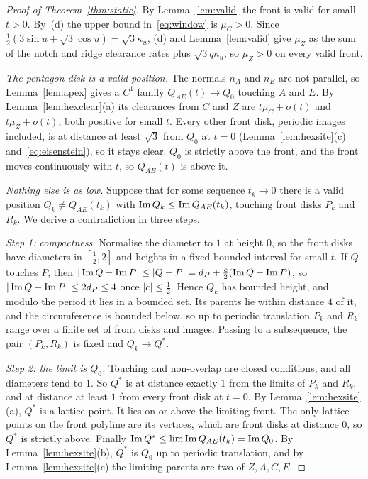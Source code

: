 \begin{proof}[Proof of Theorem~\ref{thm:static}]
By Lemma~\ref{lem:valid} the front is valid for small $t>0$. By~(d) the upper bound in~\eqref{eq:window} is
$\mu_C>0$. Since $\tfrac12(3\sin u+\sqrt3\cos u)=\sqrt3\kappa_u$, (d) and Lemma~\ref{lem:valid} give $\mu_Z$ as the sum
of the notch and ridge clearance rates plus $\sqrt3q\kappa_u$, so $\mu_Z>0$ on every valid front.

\emph{The pentagon disk is a valid position.} The normals $n_A$ and $n_E$ are not parallel, so
Lemma~\ref{lem:apex} gives a $C^1$ family $Q_{AE}(t)\to Q_0$ touching $A$ and $E$. By
Lemma~\ref{lem:hexclear}(a) its clearances from $C$ and $Z$ are $t\mu_C+o(t)$ and $t\mu_Z+o(t)$, both
positive for small $t$. Every other front disk, periodic images included, is at distance at least
$\sqrt3$ from $Q_0$ at $t=0$ (Lemma~\ref{lem:hexsite}(c) and~\eqref{eq:eisenstein}), so it stays clear.
$Q_0$ is strictly above the front, and the front moves continuously with $t$, so $Q_{AE}(t)$ is above it.

\emph{Nothing else is as low.} Suppose that for some sequence $t_k\to0$ there is a valid position
$Q_k\ne Q_{AE}(t_k)$ with $\operatorname{Im} Q_k\le\operatorname{Im} Q_{AE}(t_k)$, touching front disks $P_k$ and $R_k$. We derive a
contradiction in three steps.

\smallskip\noindent\emph{Step 1: compactness.} Normalise the diameter to $1$ at height $0$, so the front
disks have diameters in $[\tfrac12,2]$ and heights in a fixed bounded interval for small $t$. If $Q$ touches
$P$, then $|\operatorname{Im} Q-\operatorname{Im} P|\le|Q-P|=d_P+\tfrac c2(\operatorname{Im} Q-\operatorname{Im} P)$, so $|\operatorname{Im} Q-\operatorname{Im} P|\le2d_P\le4$ once $|c|\le\tfrac12$.
Hence $Q_k$ has bounded height, and modulo the period it lies in a bounded set. Its parents lie within
distance $4$ of it, and the circumference is bounded below, so up to periodic translation $P_k$ and
$R_k$ range over a finite set of front disks and images. Passing to a subsequence, the pair
$(P_k,R_k)$ is fixed and $Q_k\to Q^*$.

\smallskip\noindent\emph{Step 2: the limit is $Q_0$.} Touching and non-overlap are closed conditions, and
all diameters tend to $1$. So $Q^*$ is at distance exactly $1$ from the limits of $P_k$ and $R_k$, and at
distance at least $1$ from every front disk at $t=0$. By Lemma~\ref{lem:hexsite}(a), $Q^*$ is a lattice
point. It lies on or above the limiting front. The only lattice points on the front polyline are its
vertices, which are front disks at distance $0$, so $Q^*$ is strictly above. Finally
$\operatorname{Im} Q^*\le\lim\operatorname{Im} Q_{AE}(t_k)=\operatorname{Im} Q_0$. By Lemma~\ref{lem:hexsite}(b), $Q^*$ is $Q_0$ up to periodic
translation, and by Lemma~\ref{lem:hexsite}(c) the limiting parents are two of $Z,A,C,E$.


\end{proof}
